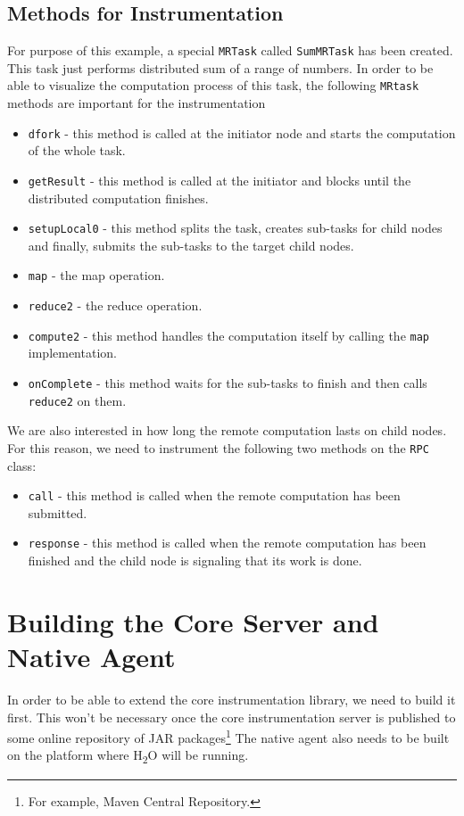 \subsection{Methods for Instrumentation}
For purpose of this example, a special \texttt{MRTask} called \texttt{SumMRTask} has been created. This task just performs distributed sum of a range of numbers. In order to be able to visualize the computation process of this task, the following \texttt{MRtask} methods are important for the instrumentation
\begin{itemize}
	\item \texttt{dfork} - this method is called at the initiator node and starts the computation of the whole task.
	\item \texttt{getResult} - this method is called at the initiator and blocks until the distributed computation finishes.
	\item \texttt{setupLocal0} - this method splits the task, creates sub-tasks for child nodes and finally, submits the sub-tasks to the target child nodes.
	\item \texttt{map} - the map operation.
	\item \texttt{reduce2} - the reduce operation.
	\item \texttt{compute2} - this method handles the computation itself by calling the \texttt{map} implementation.
	\item \texttt{onComplete} - this method waits for the sub-tasks to finish and then calls \texttt{reduce2} on them.
\end{itemize}

We are also interested in how long the remote computation lasts on child nodes. For this reason, we need to instrument the following two methods on the \texttt{RPC} class:
\begin{itemize}
	\item \texttt{call} - this method is called when the remote computation has been submitted.
	\item \texttt{response} - this method is called when the remote computation has been finished and the child node is signaling that its work is done.
\end{itemize}

\section{Building the Core Server and Native Agent}
In order to be able to extend the core instrumentation library, we need to build it first. This won't be necessary once the core instrumentation server is published to some online repository of JAR packages\footnote{For example, Maven Central Repository.} The native agent also needs to be built on the platform where H\textsubscript{2}O will be running. 

